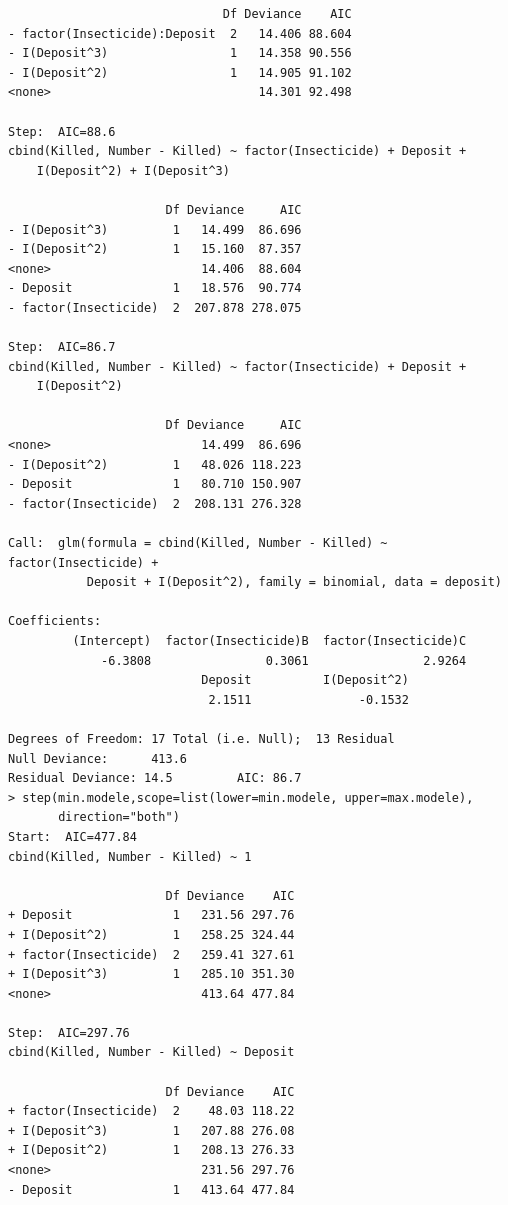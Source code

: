 \documentclass[11pt]{article}
\begin{document}
\begin{verbatim}
                              Df Deviance    AIC
- factor(Insecticide):Deposit  2   14.406 88.604
- I(Deposit^3)                 1   14.358 90.556
- I(Deposit^2)                 1   14.905 91.102
<none>                             14.301 92.498

Step:  AIC=88.6
cbind(Killed, Number - Killed) ~ factor(Insecticide) + Deposit + 
    I(Deposit^2) + I(Deposit^3)

                      Df Deviance     AIC
- I(Deposit^3)         1   14.499  86.696
- I(Deposit^2)         1   15.160  87.357
<none>                     14.406  88.604
- Deposit              1   18.576  90.774
- factor(Insecticide)  2  207.878 278.075

Step:  AIC=86.7
cbind(Killed, Number - Killed) ~ factor(Insecticide) + Deposit + 
    I(Deposit^2)

                      Df Deviance     AIC
<none>                     14.499  86.696
- I(Deposit^2)         1   48.026 118.223
- Deposit              1   80.710 150.907
- factor(Insecticide)  2  208.131 276.328

Call:  glm(formula = cbind(Killed, Number - Killed) ~ factor(Insecticide) + 
           Deposit + I(Deposit^2), family = binomial, data = deposit)

Coefficients:
         (Intercept)  factor(Insecticide)B  factor(Insecticide)C  
             -6.3808                0.3061                2.9264               
                           Deposit          I(Deposit^2) 
                            2.1511               -0.1532  

Degrees of Freedom: 17 Total (i.e. Null);  13 Residual
Null Deviance:      413.6 
Residual Deviance: 14.5         AIC: 86.7
> step(min.modele,scope=list(lower=min.modele, upper=max.modele),
       direction="both")
Start:  AIC=477.84
cbind(Killed, Number - Killed) ~ 1

                      Df Deviance    AIC
+ Deposit              1   231.56 297.76
+ I(Deposit^2)         1   258.25 324.44
+ factor(Insecticide)  2   259.41 327.61
+ I(Deposit^3)         1   285.10 351.30
<none>                     413.64 477.84

Step:  AIC=297.76
cbind(Killed, Number - Killed) ~ Deposit

                      Df Deviance    AIC
+ factor(Insecticide)  2    48.03 118.22
+ I(Deposit^3)         1   207.88 276.08
+ I(Deposit^2)         1   208.13 276.33
<none>                     231.56 297.76
- Deposit              1   413.64 477.84


\end{verbatim}
\end{document}
